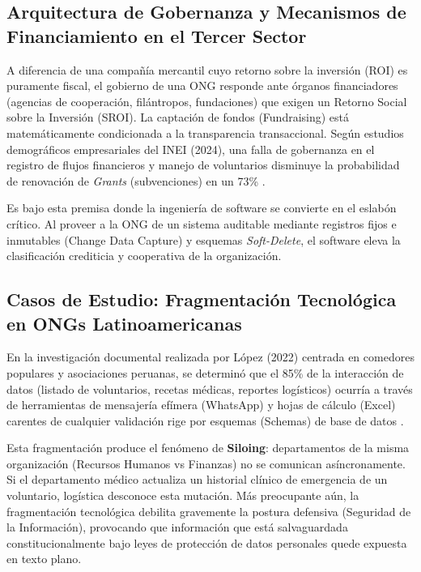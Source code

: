 \documentclass[11pt,a4paper,oneside]{report}
\begin{document}
\subsection{Arquitectura de Gobernanza y Mecanismos de Financiamiento en el Tercer Sector}
A diferencia de una compa\~n\'ia mercantil cuyo retorno sobre la inversi\'on (ROI) es puramente fiscal, el gobierno de una ONG responde ante \'organos financiadores (agencias de cooperaci\'on, fil\'antropos, fundaciones) que exigen un Retorno Social sobre la Inversi\'on (SROI). La captaci\'on de fondos (Fundraising) est\'a matem\'aticamente condicionada a la transparencia transaccional. Seg\'un estudios demogr\'aficos empresariales del INEI (2024), una falla de gobernanza en el registro de flujos financieros y manejo de voluntarios disminuye la probabilidad de renovaci\'on de \textit{Grants} (subvenciones) en un 73\% \citep{inei2024}. 

Es bajo esta premisa donde la ingenier\'ia de software se convierte en el eslab\'on cr\'itico. Al proveer a la ONG de un sistema auditable mediante registros fijos e inmutables (Change Data Capture) y esquemas \textit{Soft-Delete}, el software eleva la clasificaci\'on crediticia y cooperativa de la organizaci\'on.

\subsection{Casos de Estudio: Fragmentaci\'on Tecnol\'ogica en ONGs Latinoamericanas}
En la investigaci\'on documental realizada por L\'opez (2022) centrada en comedores populares y asociaciones peruanas, se determin\'o que el 85\% de la interacci\'on de datos (listado de voluntarios, recetas m\'edicas, reportes log\'isticos) ocurr\'ia a trav\'es de herramientas de mensajer\'ia ef\'imera (WhatsApp) y hojas de c\'alculo (Excel) carentes de cualquier validaci\'on rige por esquemas (Schemas) de base de datos \citep{lopez2022}. 

Esta fragmentaci\'on produce el fen\'omeno de \textbf{Siloing}: departamentos de la misma organizaci\'on (Recursos Humanos vs Finanzas) no se comunican as\'incronamente. Si el departamento m\'edico actualiza un historial cl\'inico de emergencia de un voluntario, log\'istica desconoce esta mutaci\'on. M\'as preocupante a\'un, la fragmentaci\'on tecnol\'ogica debilita gravemente la postura defensiva (Seguridad de la Informaci\'on), provocando que informaci\'on que est\'a salvaguardada constitucionalmente bajo leyes de protecci\'on de datos personales quede expuesta en texto plano.
\end{document}
